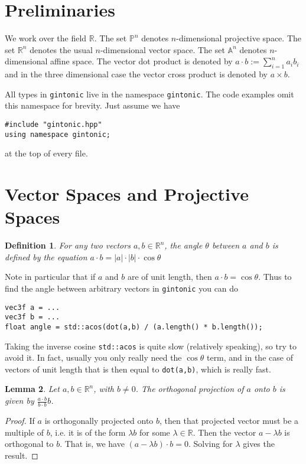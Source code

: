 \documentclass{article}
\newtheorem{definition}{Definition}
\newtheorem{lemma}[definition]{Lemma}
\begin{document}
\tableofcontents

\section{Preliminaries}

We work over the field $\mathbb{R}$. The set $\mathbb{P}^n$ denotes $n$-dimensional projective space. The set $\mathbb{R}^n$ denotes the usual $n$-dimensional vector space. The set $\mathbb{A}^n$ denotes $n$-dimensional affine space. The vector dot product is denoted by $a \cdot b := \sum_{i=1}^n a_i b_i$ and in the three dimensional case the vector cross product is denoted by $a \times b$.

All types in \texttt{gintonic} live in the namespace \texttt{gintonic}. The code examples omit this namespace for brevity. Just assume we have

\begin{lstlisting}
#include "gintonic.hpp"
using namespace gintonic;
\end{lstlisting}
at the top of every file.

\section{Vector Spaces and Projective Spaces}

\begin{definition}
For any two vectors $a,b \in \mathbb{R}^n$, the angle $\theta$ between $a$ and $b$ is defined by the equation $a \cdot b = |a| \cdot |b| \cdot \cos \theta$
\end{definition}
Note in particular that if $a$ and $b$ are of unit length, then $a \cdot b = \cos \theta$. Thus to find the angle between arbitrary vectors in \texttt{gintonic} you can do

\begin{lstlisting}
vec3f a = ...
vec3f b = ...
float angle = std::acos(dot(a,b) / (a.length() * b.length());
\end{lstlisting}
Taking the inverse cosine \texttt{std::acos} is quite slow (relatively speaking), so try to avoid it. In fact, usually you only really need the $\cos \theta$ term, and in the case of vectors of unit length that is then equal to \texttt{dot(a,b)}, which is really fast.

\begin{lemma}
Let $a,b \in \mathbb{R}^n$, with $b \neq 0$. The orthogonal projection of $a$ onto $b$ is given by $\frac{a\cdot b}{b \cdot b}b$.
\end{lemma}
\begin{proof}
If $a$ is orthogonally projected onto $b$, then that projected vector must be a multiple of $b$, i.e. it is of the form $\lambda b$ for some $\lambda \in \mathbb{R}$. Then the vector $a - \lambda b$ is orthogonal to $b$. That is, we have $(a - \lambda b) \cdot b = 0$. Solving for $\lambda$ gives the result.
\end{proof}
\end{document}
